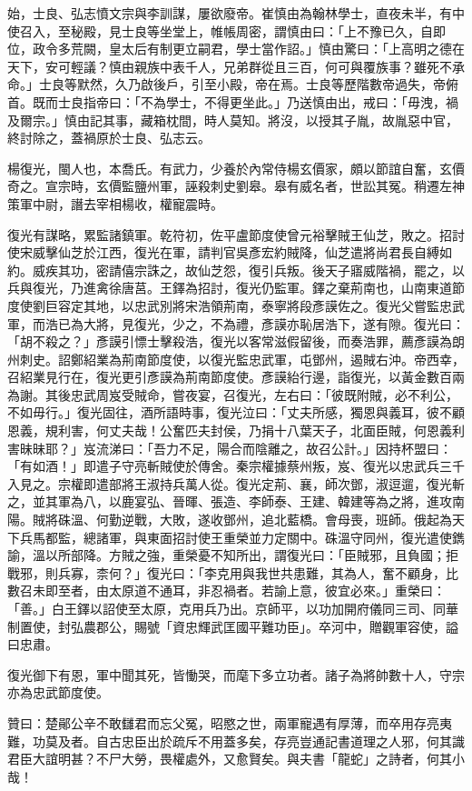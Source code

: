 \begin{pinyinscope}
 始，士良、弘志憤文宗與李訓謀，屢欲廢帝。崔慎由為翰林學士，直夜未半，有中使召入，至秘殿，見士良等坐堂上，帷帳周密，謂慎由曰：「上不豫已久，自即位，政令多荒闕，皇太后有制更立嗣君，學士當作詔。」慎由驚曰：「上高明之德在天下，安可輕議？慎由親族中表千人，兄弟群從且三百，何可與覆族事？雖死不承命。」士良等默然，久乃啟後戶，引至小殿，帝在焉。士良等歷階數帝過失，帝俯首。既而士良指帝曰：「不為學士，不得更坐此。」乃送慎由出，戒曰：「毋洩，禍及爾宗。」慎由記其事，藏箱枕間，時人莫知。將沒，以授其子胤，故胤惡中官，終討除之，蓋禍原於士良、弘志云。



 楊復光，閩人也，本喬氏。有武力，少養於內常侍楊玄價家，頗以節誼自奮，玄價奇之。宣宗時，玄價監鹽州軍，誣殺刺史劉皋。皋有威名者，世訟其冤。稍遷左神策軍中尉，譖去宰相楊收，權寵震時。



 復光有謀略，累監諸鎮軍。乾符初，佐平盧節度使曾元裕擊賊王仙芝，敗之。招討使宋威擊仙芝於江西，復光在軍，請判官吳彥宏約賊降，仙芝遣將尚君長自縛如約。威疾其功，密請僖宗誅之，故仙芝怨，復引兵叛。後天子寤威階禍，罷之，以兵與復光，乃進禽徐唐莒。王鐸為招討，復光仍監軍。鐸之棄荊南也，山南東道節度使劉巨容定其地，以忠武別將宋浩領荊南，泰寧將段彥謨佐之。復光父嘗監忠武軍，而浩已為大將，見復光，少之，不為禮，彥謨亦恥居浩下，遂有隙。復光曰：「胡不殺之？」彥謨引慓士擊殺浩，復光以客常滋假留後，而奏浩罪，薦彥謨為朗州刺史。詔鄭紹業為荊南節度使，以復光監忠武軍，屯鄧州，遏賊右沖。帝西幸，召紹業見行在，復光更引彥謨為荊南節度使。彥謨紿行邊，詣復光，以黃金數百兩為謝。其後忠武周岌受賊命，嘗夜宴，召復光，左右曰：「彼既附賊，必不利公，不如毋行。」復光固往，酒所語時事，復光泣曰：「丈夫所感，獨恩與義耳，彼不顧恩義，規利害，何丈夫哉！公奮匹夫封侯，乃捐十八葉天子，北面臣賊，何恩義利害昧昧耶？」岌流涕曰：「吾力不足，陽合而陰離之，故召公計。」因持杯盟曰：「有如酒！」即遣子守亮斬賊使於傳舍。秦宗權據蔡州叛，岌、復光以忠武兵三千入見之。宗權即遣部將王淑持兵萬人從。復光定荊、襄，師次鄧，淑逗遛，復光斬之，並其軍為八，以鹿宴弘、晉暉、張造、李師泰、王建、韓建等為之將，進攻南陽。賊將硃溫、何勤逆戰，大敗，遂收鄧州，追北藍橋。會母喪，班師。俄起為天下兵馬都監，總諸軍，與東面招討使王重榮並力定關中。硃溫守同州，復光遣使鐫諭，溫以所部降。方賊之強，重榮憂不知所出，謂復光曰：「臣賊邪，且負國；拒戰邪，則兵寡，柰何？」復光曰：「李克用與我世共患難，其為人，奮不顧身，比數召未即至者，由太原道不通耳，非忍禍者。若諭上意，彼宜必來。」重榮曰：「善。」白王鐸以詔使至太原，克用兵乃出。京師平，以功加開府儀同三司、同華制置使，封弘農郡公，賜號「資忠輝武匡國平難功臣」。卒河中，贈觀軍容使，謚曰忠肅。



 復光御下有恩，軍中聞其死，皆慟哭，而麾下多立功者。諸子為將帥數十人，守宗亦為忠武節度使。



 贊曰：楚鄖公辛不敢讎君而忘父冤，昭愍之世，兩軍寵遇有厚薄，而卒用存亮夷難，功莫及者。自古忠臣出於疏斥不用蓋多矣，存亮豈通記書道理之人邪，何其識君臣大誼明甚？不尸大勞，畏權處外，又愈賢矣。與夫書「龍蛇」之詩者，何其小哉！



\end{pinyinscope}